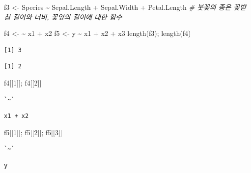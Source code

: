 \documentclass[
  11pt,
]{krantz}
\newenvironment{Shaded}{\begin{snugshade}}{\end{snugshade}}
\newcommand{\CommentTok}[1]{\textcolor[rgb]{0.37,0.37,0.37}{\textit{#1}}}
\newcommand{\DecValTok}[1]{\textcolor[rgb]{0.06,0.06,0.06}{#1}}
\newcommand{\ErrorTok}[1]{\textcolor[rgb]{0.14,0.14,0.14}{\textbf{#1}}}
\newcommand{\FunctionTok}[1]{\textcolor[rgb]{0,0,0}{#1}}
\newcommand{\NormalTok}[1]{#1}
\newcommand{\OtherTok}[1]{\textcolor[rgb]{0.37,0.37,0.37}{#1}}
\newcommand{\SpecialCharTok}[1]{\textcolor[rgb]{0,0,0}{#1}}
\begin{document}
\begin{Shaded}
\begin{Highlighting}[]
\NormalTok{f3 }\OtherTok{\textless{}{-}}\NormalTok{ Species }\SpecialCharTok{\textasciitilde{}}\NormalTok{ Sepal.Length }\SpecialCharTok{+}\NormalTok{ Sepal.Width }\SpecialCharTok{+}\NormalTok{ Petal.Length}
\CommentTok{\# 붓꽃의 종은 꽃받침 길이와 너비, 꽃잎의 길이에 대한 함수}


\NormalTok{f4 }\OtherTok{\textless{}{-}} \ErrorTok{\textasciitilde{}}\NormalTok{ x1 }\SpecialCharTok{+}\NormalTok{ x2}
\NormalTok{f5 }\OtherTok{\textless{}{-}}\NormalTok{ y }\SpecialCharTok{\textasciitilde{}}\NormalTok{ x1 }\SpecialCharTok{+}\NormalTok{ x2 }\SpecialCharTok{+}\NormalTok{ x3}
\FunctionTok{length}\NormalTok{(f3); }\FunctionTok{length}\NormalTok{(f4)}
\end{Highlighting}
\end{Shaded}

\begin{verbatim}
[1] 3
\end{verbatim}

\begin{verbatim}
[1] 2
\end{verbatim}

\begin{Shaded}
\begin{Highlighting}[]
\NormalTok{f4[[}\DecValTok{1}\NormalTok{]]; f4[[}\DecValTok{2}\NormalTok{]]}
\end{Highlighting}
\end{Shaded}

\begin{verbatim}
`~`
\end{verbatim}

\begin{verbatim}
x1 + x2
\end{verbatim}

\begin{Shaded}
\begin{Highlighting}[]
\NormalTok{f5[[}\DecValTok{1}\NormalTok{]]; f5[[}\DecValTok{2}\NormalTok{]]; f5[[}\DecValTok{3}\NormalTok{]]}
\end{Highlighting}
\end{Shaded}

\begin{verbatim}
`~`
\end{verbatim}

\begin{verbatim}
y
\end{verbatim}
\end{document}
